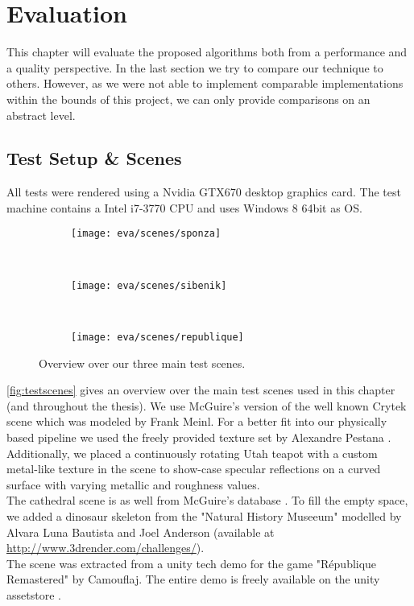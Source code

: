 \documentclass[thesis.tex]{subfiles}
\begin{document}
\chapter{Evaluation}\label{chap:eva}
This chapter will evaluate the proposed algorithms both from a performance and a quality perspective.
In the last section we try to compare our technique to others.
However, as we were not able to implement comparable implementations within the bounds of this project, we can only provide comparisons on an abstract level.

\section{Test Setup \& Scenes} \label{sec:eva:setup}
All tests were rendered using a Nvidia GTX670 desktop graphics card.
The test machine contains a Intel i7-3770 CPU and uses Windows 8 64bit as OS.

\begin{figure}
\centering
\begin{subfigure}[b]{0.8\textwidth}
\centering
\texttt{[image: eva/scenes/sponza]}
\caption{}
\end{subfigure}
\\
\begin{subfigure}[b]{0.8\textwidth}
\centering
\texttt{[image: eva/scenes/sibenik]}
\caption{}
\end{subfigure}
\\
\begin{subfigure}[b]{0.8\textwidth}
\centering
\texttt{[image: eva/scenes/republique]}
\caption{}
\end{subfigure}
\caption{Overview over our three main test scenes.}
\label{fig:testscenes}
\end{figure}
\autoref{fig:testscenes} gives an overview over the main test scenes used in this chapter (and throughout the thesis).
We use McGuire's \cite{bib:McGuire2011Data} version of the well known Crytek  scene which was modeled by Frank Meinl.
For a better fit into our physically based pipeline we used the freely provided texture set  by Alexandre Pestana \cite{bib:sponzapbr}.
Additionally, we placed a continuously rotating Utah teapot with a custom metal-like texture in the scene to show-case specular reflections on a curved surface with varying metallic and roughness values.
\\
The  cathedral scene is as well from McGuire's database \cite{bib:McGuire2011Data}.
To fill the empty space, we added a dinosaur skeleton from the "Natural History Museeum" modelled by Alvara Luna Bautista and Joel Anderson (available at \url{http://www.3drender.com/challenges/}).
\\
The  scene was extracted from a unity tech demo for the game "République Remastered" by Camouflaj.
The entire demo is freely available on the unity assetstore \cite{bib:republique}.
\end{document}
